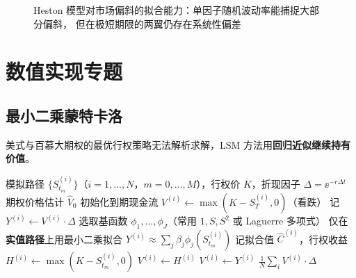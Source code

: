 \begin{figure}[htbp]
\centering
{}
\caption{Heston 模型对市场偏斜的拟合能力：单因子随机波动率能捕捉大部分偏斜，
但在极短期限的两翼仍存在系统性偏差}\label{fig:06-heston-smile}
\end{figure}

\section{数值实现专题}

\subsection{最小二乘蒙特卡洛}

美式与百慕大期权的最优行权策略无法解析求解，LSM 方法用\textbf{回归近似继续持有价值}。

\begin{algorithm}[htbp]
\caption{最小二乘蒙特卡洛（LSM）定价美式期权}\label{alg:06-lsm}
\begin{algorithmic}[1]
\Require 模拟路径 $\{S^{(i)}_{t_m}\}$（$i=1,\dots,N$，$m=0,\dots,M$），行权价 $K$，折现因子 $\Delta=\ee^{-r\Delta t}$
\Ensure 期权价格估计 $\hat{V}_0$
\State 初始化到期现金流 $V^{(i)} \gets \max(K-S^{(i)}_{T},0)$（看跌）
  \State 记 $Y^{(i)} \gets V^{(i)}\cdot\Delta$ 
  \State 选取基函数 $\phi_1,\dots,\phi_J$（常用 $1,S,S^2$ 或 Laguerre 多项式）
  \State 仅在\textbf{实值路径}上用最小二乘拟合 $Y^{(i)}\approx\sum_j\beta_j\phi_j(S^{(i)}_{t_m})$
  \State 记拟合值 $\hat{C}^{(i)}$，行权收益 $H^{(i)}\gets\max(K-S^{(i)}_{t_m},0)$
    \State $V^{(i)}\gets H^{(i)}$ 
  \Else
    \State $V^{(i)}\gets Y^{(i)}$ 
  \EndIf
\EndFor
\State \Return $\frac1N\sum_i V^{(i)}\cdot\Delta$
\end{algorithmic}
\end{algorithm}

